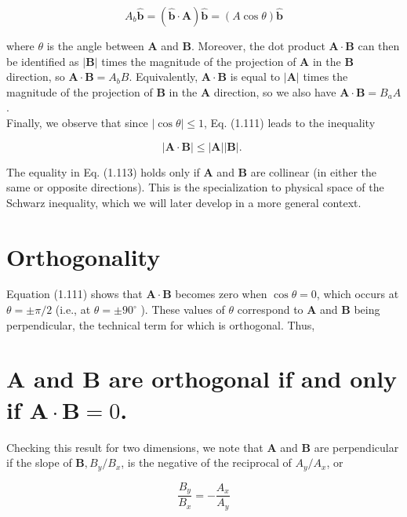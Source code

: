 \documentclass[10pt]{article}
\begin{document}
\begin{equation*}
A_{b} \hat{\mathbf{b}}=(\hat{\mathbf{b}} \cdot \mathbf{A}) \hat{\mathbf{b}}=(A \cos \theta) \hat{\mathbf{b}} \tag{1.112}
\end{equation*}


where $\theta$ is the angle between $\mathbf{A}$ and $\mathbf{B}$. Moreover, the dot product $\mathbf{A} \cdot \mathbf{B}$ can then be identified as $|\mathbf{B}|$ times the magnitude of the projection of $\mathbf{A}$ in the $\mathbf{B}$ direction, so $\mathbf{A} \cdot \mathbf{B}=A_{b} B$. Equivalently, $\mathbf{A} \cdot \mathbf{B}$ is equal to $|\mathbf{A}|$ times the magnitude of the projection of $\mathbf{B}$ in the $\mathbf{A}$ direction, so we also have $\mathbf{A} \cdot \mathbf{B}=B_{a} A$.\\
Finally, we observe that since $|\cos \theta| \leq 1$, Eq. (1.111) leads to the inequality


\begin{equation*}
|\mathbf{A} \cdot \mathbf{B}| \leq|\mathbf{A}||\mathbf{B}| \text {. } \tag{1.113}
\end{equation*}


The equality in Eq. (1.113) holds only if $\mathbf{A}$ and $\mathbf{B}$ are collinear (in either the same or opposite directions). This is the specialization to physical space of the Schwarz inequality, which we will later develop in a more general context.

\section*{Orthogonality}
Equation (1.111) shows that $\mathbf{A} \cdot \mathbf{B}$ becomes zero when $\cos \theta=0$, which occurs at $\theta= \pm \pi / 2$ (i.e., at $\theta= \pm 90^{\circ}$ ). These values of $\theta$ correspond to $\mathbf{A}$ and $\mathbf{B}$ being perpendicular, the technical term for which is orthogonal. Thus,

\section*{$\mathbf{A}$ and $\mathbf{B}$ are orthogonal if and only if $\mathbf{A} \cdot \mathbf{B}=0$.}
Checking this result for two dimensions, we note that $\mathbf{A}$ and $\mathbf{B}$ are perpendicular if the slope of $\mathbf{B}, B_{y} / B_{x}$, is the negative of the reciprocal of $A_{y} / A_{x}$, or

$$
\frac{B_{y}}{B_{x}}=-\frac{A_{x}}{A_{y}}
$$
\end{document}
